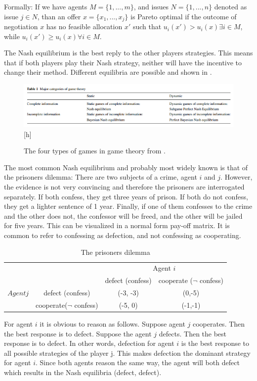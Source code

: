 Formally: If we have agents $M = \{1,...,m\}$, and issues $N = \{1,...,n\}$ denoted as issue $j\in N$, than an offer $x = \{x_1, ..., x_j\}$ is Pareto optimal if the outcome of negotiation $x$ has no feasible allocation $x'$ such that $u_i(x')> u_i(x) \exists i \in M$, while $u_i(x')\geq u_i(x) \forall i \in M$. 

The Nash equilibrium is the best reply to the other players strategies. This means that if both players play their Nash strategy, neither will have the incentive to change their method. Different equilibria are possible and shown in . 

\begin{figure}[h]
	\centering
	\includegraphics[width=0.9\linewidth]{img/major_categories_of_game_theory}[h]
	\caption{The four types of games in game theory from \citet{trappey2013multi}.}
	\label{fig:majorcategoriesofgametheory}
\end{figure}
The most common Nash equilibrium and probably most widely known is that of the prisoners dilemma:
There are two subjects of a crime, agent $i$ and $j$. However, the evidence is not very convincing and therefore the prisoners are interrogated separately. If both confess, they get three years of prison. If both do not confess, they get a lighter sentence of 1 year. Finally, if one of them confesses to the crime and the other does not, the confessor will be freed, and the other will be jailed for five years.
This can be visualized in a normal form pay-off matrix. It is common to refer to confessing as defection, and not confessing as cooperating.
\begin{table}[h]

\begin{tabular}{|c|c|c|c|}
	\hline 
		&  				& \multicolumn{2}{c}{Agent $i$}\\ 
	 	&				& defect (confess) 	& cooperate ($\neg$ confess) \\ 
	$Agent j$	& defect (confess)	&  	(-3, -3)			& (0,-5) \\ 
		& cooperate($\neg $ confess) 	&  (-5, 0)				& (-1,-1) \\ 
	\hline 
\end{tabular} \label{tab:nashprison} \caption{The prisoners dilemma}
\end{table}
For agent $i$ it is obvious to reason as follows. Suppose agent $j$ cooperates. Then the best response is to defect. Suppose the agent $j$ defects. Then the best response is to defect. In other words, defection for agent $i$ is the best response to all possible strategies of the player j. This makes defection the dominant strategy for agent $i$. Since both agents reason the same way, the agent will both defect which results in the Nash equilibria (defect, defect).

